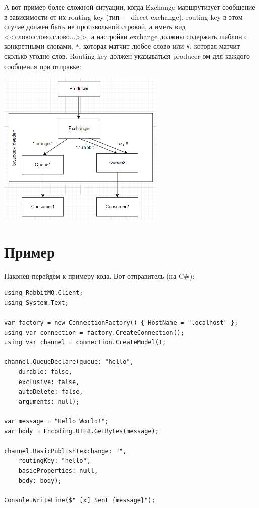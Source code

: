 \documentclass{../../text-style}
\begin{document}
А вот пример более сложной ситуации, когда Exchange маршрутизует сообщение в зависимости от их routing key (тип --- direct exchange). routing key в этом случае должен быть не произвольной строкой, а иметь вид <<слово.слово.слово...>>, а настройки exchange должны содержать шаблон с конкретными словами, \verb|*|, которая матчит любое слово или \verb|#|, которая матчит сколько угодно слов. Routing key должен указываться producer-ом для каждого сообщения при отправке:

\begin{center}
    \includegraphics[width=0.6\textwidth]{topicExchange.png}
\end{center}

\section{Пример}

Наконец перейдём к примеру кода. Вот отправитель (на C\#):

\begin{verbatim}
using RabbitMQ.Client;
using System.Text;

var factory = new ConnectionFactory() { HostName = "localhost" };
using var connection = factory.CreateConnection();
using var channel = connection.CreateModel();

channel.QueueDeclare(queue: "hello",
    durable: false,
    exclusive: false,
    autoDelete: false,
    arguments: null);

var message = "Hello World!";
var body = Encoding.UTF8.GetBytes(message);

channel.BasicPublish(exchange: "",
    routingKey: "hello",
    basicProperties: null,
    body: body);

Console.WriteLine($" [x] Sent {message}");
\end{verbatim}
\end{document}
